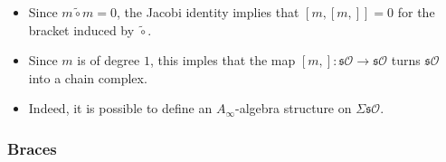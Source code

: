 \documentclass{beamer}
\theoremstyle{definition}
\begin{document}
\begin{frame}
\begin{itemize}
\item<1-> Since $m\tilde{\circ}m=0$, the Jacobi identity implies that $[m,[m,]]=0$ for the bracket induced by $\tilde{\circ}$.
\item<2-> Since $m$ is of degree $1$, this imples that the map $[m,]:\mathfrak{s}\mathcal{O}\to\mathfrak{s}\mathcal{O}$ turns $\mathfrak{s}\mathcal{O}$ into a chain complex. %
\item<3-> Indeed, it is possible to define an $A_\infty$-algebra structure on $\Sigma\mathfrak{s}\mathcal{O}$. 
\end{itemize}
\end{frame}
\subsubsection{Braces}
\end{document}
